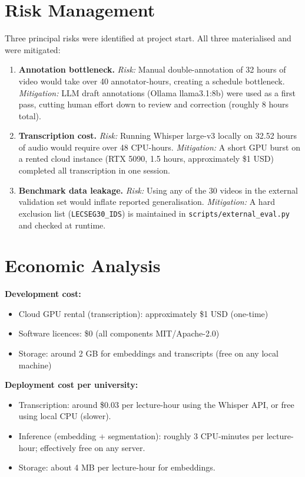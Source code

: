 \section{Risk Management}

Three principal risks were identified at project start. All three materialised
and were mitigated:

\begin{enumerate}
  \item \textbf{Annotation bottleneck.}
        \textit{Risk:} Manual double-annotation of 32 hours of video would take
        over 40 annotator-hours, creating a schedule bottleneck.
        \textit{Mitigation:} LLM draft annotations (Ollama llama3.1:8b) were used
        as a first pass, cutting human effort down to review and correction
        (roughly 8 hours total).

  \item \textbf{Transcription cost.}
        \textit{Risk:} Running Whisper large-v3 locally on 32.52 hours of audio
        would require over 48 CPU-hours.
        \textit{Mitigation:} A short GPU burst on a rented cloud instance (RTX 5090,
        1.5 hours, approximately \$1 USD) completed all transcription in one session.

  \item \textbf{Benchmark data leakage.}
        \textit{Risk:} Using any of the 30 \dataset{} videos in the external
        validation set would inflate reported generalisation.
        \textit{Mitigation:} A hard exclusion list (\texttt{LECSEG30\_IDS}) is
        maintained in \texttt{scripts/external\_eval.py} and checked at runtime.
\end{enumerate}

\section{Economic Analysis}

\textbf{Development cost:}
\begin{itemize}
  \item Cloud GPU rental (transcription): approximately \$1 USD (one-time)
  \item Software licences: \$0 (all components MIT/Apache-2.0)
  \item Storage: around 2 GB for embeddings and transcripts (free on any local machine)
\end{itemize}

\textbf{Deployment cost per university:}
\begin{itemize}
  \item Transcription: around \$0.03 per lecture-hour using the Whisper API,
        or free using local CPU (slower).
  \item Inference (embedding + segmentation): roughly 3 CPU-minutes per
        lecture-hour; effectively free on any server.
  \item Storage: about 4 MB per lecture-hour for embeddings.
\end{itemize}

